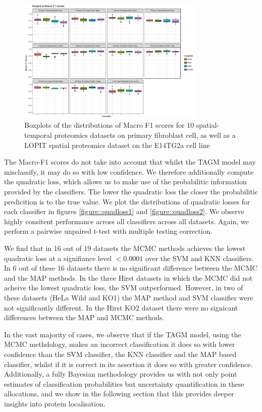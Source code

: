 \documentclass[12pt,english]{article}\usepackage[]{graphicx}\usepackage[]{color}
\begin{document}
\begin{figure}[ht]
  \centering
\includegraphics[width=0.8\textwidth]{F1comparisons2.pdf}
  \caption{Boxplots of the distributions of Macro F1 scores
    for 10 spatial-temporal proteomics datasets on primary fibroblast cell,
    as well as a LOPIT spatial proteomics dataset on the E14TG2a cell line }
  \label{figure::f1scores2}
\end{figure}

\clearpage

The Macro-F1 scores do not take into account that whilst the
TAGM model may misclassify, it may do so with low confidence. We
therefore additionally compute the quadratic loss, which allows
us to make use of the probabilitic information provided
by the classifiers. The lower the quadratic loss the closer the
probabilitic predicition is to the true value. We plot the
distributions of quadratic losses for each classifier in figures
\ref{figure::quadloss1} and \ref{figure::quadloss2}. We observe highly
consitent performance across all classifiers across all
datasets. Again, we perform a pairwise unpaired t-test with multiple
testing correction.

We find that in 16 out of 19 datasets the MCMC methods achieves the
lowest quadratic loss at a signifiance level $<0.0001$ over the SVM
and KNN classifiers. In 6 out of these 16 datasets there is no
significant difference between the MCMC and the MAP methods. In the
three Hirst datasets in which the MCMC did not acheive the lowest
quadratic loss, the SVM outperformed. However, in two of these
datasets (HeLa Wild and KO1) the MAP method and SVM classifier were
not significantly different. In the Hirst KO2 dataset there were no
signicant differences between the MAP and MCMC methods.

In the vast majority of cases, we observe that if the TAGM model,
using the MCMC methdology, makes an incorrect classification it does
so with lower confidence than the SVM classifier, the KNN classifier
and the MAP based classifier, whilst if it is correct in its assertion
it does so with greater confidence. Additionally, a fully Bayesian
methodology provides us with not only point estimates of
classification probabilities but uncertainty quantification in these
allocations, and we show in the following section that this provides
deeper insights into protein localisation.
\end{document}
